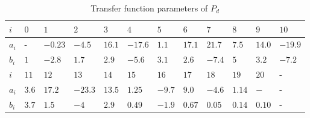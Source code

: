 \begin{table}[h!]
  \centering
  \begin{tabular}{| l | l | l | l | l | l | l | l | l | l | l | l |}
    \hline
    $i$   & $0$ & $1$ & $2$ & $3$ & $4$ & $5$ & $6$ & $7$ & $8$ & $9$ & $10$\\ \hline
    $a_i$ & -   & $-0.23$ & $-4.5$ & $16.1$ & $-17.6$ & $1.1$ & $17.1$ & $21.7$ & $7.5$ & $14.0$ & $-19.9$\\
    $b_i$ & $1$ & $-2.8$ & $1.7$ & $2.9$ & $-5.6$ & $3.1$ & $2.6$ & $-7.4$ & $5$ & $3.2$ & $-7.2$ \\ \hline
    $i$   & $11$ & $12$ & $13$ & $14$ & $15$ & $16$ & $17$ & $18$ & $19$ & $20$ & -\\ \hline
    $a_i$ & $3.6$ & $17.2$ & $-23.3$ & $13.5$ & $1.25$ & $-9.7$ & $9.0$ & $-4.6$ & $1.14$ & $-$ & - \\
    $b_i$ & $3.7$ & $1.5$ & $-4$ & $2.9$ & $0.49$ & $-1.9$ & $0.67$ & $0.05$ & $0.14$ & $0.10$ & - \\
    \hline
  \end{tabular}
  \caption{\label{tab:fdc_param} Transfer function parameters of $P_d$}
\end{table}
